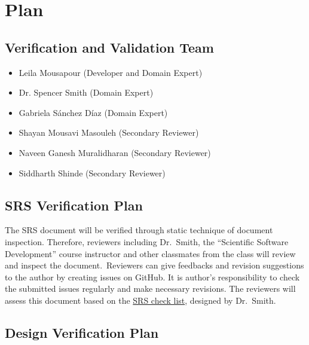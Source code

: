 \documentclass[12pt, titlepage]{article}
\begin{document}

\section{Plan}
	
\subsection{Verification and Validation Team}

\begin{itemize}
	\item Leila Mousapour (Developer and Domain Expert)
	\item Dr. Spencer Smith (Domain Expert)
	\item Gabriela Sánchez Díaz (Domain Expert)
	\item Shayan Mousavi Masouleh (Secondary Reviewer)
	\item Naveen Ganesh Muralidharan (Secondary Reviewer)
	\item Siddharth Shinde (Secondary Reviewer)
\end{itemize}
	
\subsection{SRS Verification Plan}

The SRS document will be verified through static technique of document inspection. Therefore, reviewers including Dr.\ Smith, the \enquote{Scientific Software Development} course instructor and other classmates from the class will review and inspect the document.\ Reviewers can give feedbacks and revision suggestions to the author by creating issues on GitHub. It is author’s responsibility to check the submitted issues regularly and make necessary revisions. The reviewers will assess this document based on the \href{https://gitlab.cas.mcmaster.ca/smiths/cas741/-/blob/master/BlankProjectTemplate/docs/SRS/SRS-Checklist.pdf}{SRS check list}, designed by Dr.\ Smith.


\subsection{Design Verification Plan}
\end{document}
